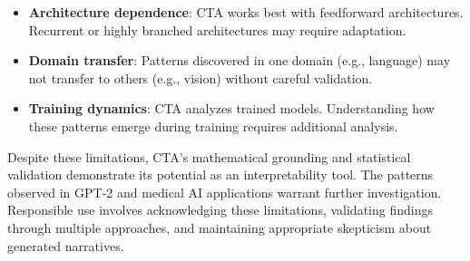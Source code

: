 \begin{itemize}
    \item \textbf{Architecture dependence}: CTA works best with feedforward architectures. Recurrent or highly branched architectures may require adaptation.
    \item \textbf{Domain transfer}: Patterns discovered in one domain (e.g., language) may not transfer to others (e.g., vision) without careful validation.
    \item \textbf{Training dynamics}: CTA analyzes trained models. Understanding how these patterns emerge during training requires additional analysis.
\end{itemize}

Despite these limitations, CTA's mathematical grounding and statistical validation demonstrate its potential as an interpretability tool. The patterns observed in GPT-2 and medical AI applications warrant further investigation. Responsible use involves acknowledging these limitations, validating findings through multiple approaches, and maintaining appropriate skepticism about generated narratives.
